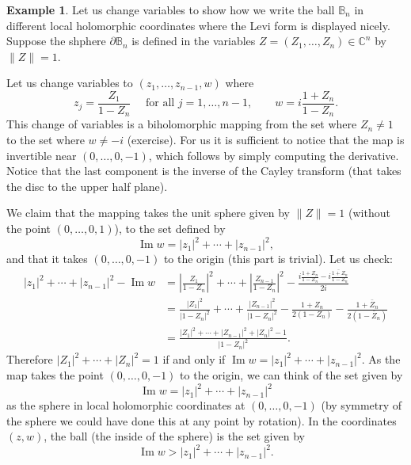 \documentclass[12pt,openany]{book}
\renewcommand{\Im}{\operatorname{Im}}
\newcommand{\sabs}[1]{\lvert {#1} \rvert}
\newcommand{\snorm}[1]{\lVert {#1} \rVert}
\newcommand{\abs}[1]{\left\lvert {#1} \right\rvert}
\newcommand{\C}{{\mathbb{C}}}
\newcommand{\bB}{{\mathbb{B}}}
\theoremstyle{plain}
\theoremstyle{remark}
\theoremstyle{definition}
\theoremstyle{exercise}
\theoremstyle{example}
\newtheorem{example}[thm]{Example}
\begin{document}
\begin{example}
Let us change variables to show how we write the ball $\bB_n$ in different
local holomorphic coordinates where the Levi form is displayed nicely.
Suppose the shphere $\partial \bB_n$ is defined in the variables $Z = (Z_1,\ldots,Z_n) \in \C^n$
by $\snorm{Z} = 1$.

Let us change variables 
to $(z_1,\ldots,z_{n-1},w)$ where
\begin{equation*}
z_j = \frac{Z_1}{1-Z_n} \quad \text{ for all $j=1,\ldots,n-1$}, \qquad
w = i\frac{1+Z_n}{1-Z_n} .
\end{equation*}
This change of variables is a biholomorphic mapping from the set where $Z_n \not= 1$
to the set where $w\not= -i$ (exercise).  For us it is 
sufficient to notice that the map is invertible near
$(0,\ldots,0,-1)$, which follows by simply computing the derivative.
Notice
that the last component is the inverse of the Cayley transform (that takes
the disc to the upper half plane).

We claim that the mapping takes the unit sphere given by $\snorm{Z} = 1$
(without the point $(0,\ldots,0,1)$), to
the set defined by
\begin{equation*}
\Im w = \sabs{z_1}^2 + \cdots + \sabs{z_{n-1}}^2 ,
\end{equation*}
and that it takes $(0,\ldots,0,-1)$ to the origin (this part is trivial).
Let us check:
\begin{equation*}
\begin{split}
\sabs{z_1}^2 + \cdots + \sabs{z_{n-1}}^2 - \Im w
& =
\abs{\frac{Z_1}{1-Z_n}}^2
+ \cdots +
\abs{\frac{Z_{n-1}}{1-Z_n}}^2
-
\frac{
i\frac{1+Z_n}{1-Z_n} -
\overline{
i\frac{1+Z_n}{1-Z_n}}
}{2i}
\\
& =
\frac{\sabs{Z_1}^2}{\sabs{1-Z_n}^2}
+ \cdots +
\frac{\sabs{Z_{n-1}}^2}{\sabs{1-Z_n}^2}
-
\frac{1+Z_n}{2(1-Z_n)} -
\frac{1+\bar{Z}_n}{2(1-\bar{Z}_n)}
\\
& = 
\frac{\sabs{Z_1}^2 %
+ \cdots +
\sabs{Z_{n-1}}^2 %
+
\sabs{Z_n}^2-1}{\sabs{1-Z_n}^2} .
\end{split}
\end{equation*}
Therefore $\sabs{Z_1}^2 + \cdots + \sabs{Z_n}^2 = 1$ if and only if $\Im w =
\sabs{z_1}^2 + \cdots + \sabs{z_{n-1}}^2$.
As the map takes the point $(0,\ldots,0,-1)$ to the origin, we can
think of the set given by
\begin{equation*}
\Im w = \sabs{z_1}^2 + \cdots + \sabs{z_{n-1}}^2 
\end{equation*}
as the sphere in local holomorphic coordinates at $(0,\ldots,0,-1)$ (by symmetry
of the sphere we could have done this at any point by rotation).
In the coordinates $(z,w)$, the ball (the inside of the sphere) is the set given by
\begin{equation*}
\Im w > \sabs{z_1}^2 + \cdots + \sabs{z_{n-1}}^2 .
\end{equation*}


\end{example}
\end{document}
